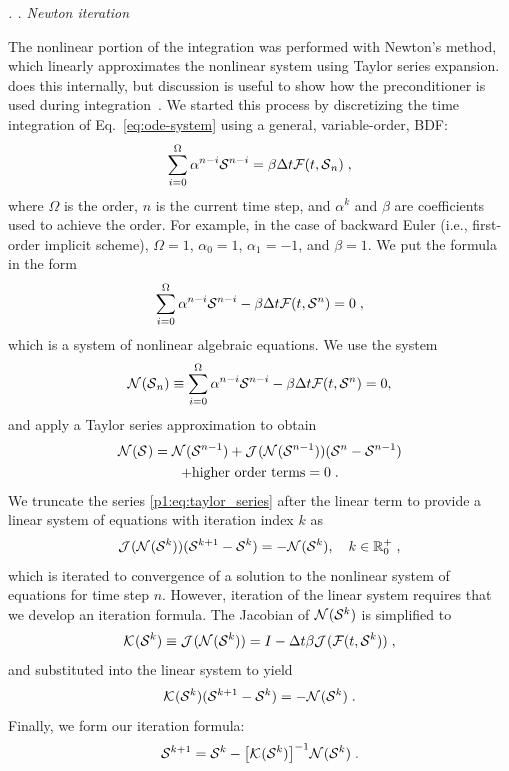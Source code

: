 \documentclass[twocolumn,10pt]{article} %
\renewcommand{\subsection}%
              [1]%
              {%
               \bgroup%
               \flushleft%
               \small\em%
               \stepcounter{subsection}%
               \arabic{section}.%
               \arabic{subsection}. #1%
               \par%
               \egroup%
              }%
\newcommand{\sectionTwo}[1]{\subsection{#1} \addvspace{10pt}}
\begin{document}
\sectionTwo{Newton iteration}

The nonlinear portion of the integration was performed with Newton's method,
which linearly approximates the nonlinear system using Taylor series expansion.
\sundials{} does this internally, but discussion is useful to show how the preconditioner is used during integration~\cite{hindmarsh_sundials_2005}.
We started this process by discretizing the time integration of Eq.~\eqref{eq:ode-system} using a general, variable-order, BDF:
\begin{equation}
    \sum^{\Omega}_{i=0}{\alpha^{n-i} \mathcal{S}{}^{n-i}} = \beta \Delta t\mathcal{F}(t, \mathcal{S}{}_{n}) \;,
\end{equation}
where $\Omega$ is the order, $n$ is the current time step, and
$\alpha^{k}$ and $\beta$ are coefficients used to achieve the order.
For example, in the case of backward Euler (i.e., first-order implicit scheme), $\Omega = 1$, $\alpha_0 = 1$, $\alpha_1 = -1$, and $\beta = 1$.
We put the formula in the form
\begin{equation}
    \sum^{\Omega}_{i=0}{\alpha^{n-i} \mathcal{S}{}^{n-i}} - \beta \Delta t\mathcal{F}(t, \mathcal{S}{}^{n}) = 0 \;,
\end{equation}
which is a system of nonlinear algebraic equations.
We use the system
\begin{equation}
    \mathcal{N}^{}(\mathcal{S}{}_n) \equiv \sum^{\Omega}_{i=0}{\alpha^{n-i} \mathcal{S}{}^{n-i}} - \beta \Delta t\mathcal{F}(t, \mathcal{S}{}^{n}) = 0,
\end{equation}
and apply a Taylor series approximation to obtain
\begin{multline}
    \label{p1:eq:taylor_series}
    \mathcal{N}^{}(\mathcal{S}{}^{}) = \mathcal{N}^{}(\mathcal{S}^{n-1}) + \mathcal{J}^{}(\mathcal{N}^{}(\mathcal{S}{}^{n-1}))(\mathcal{S}{}^{n}-\mathcal{S}{}^{n-1}) \\ + \text{higher order terms} = 0 \;.
\end{multline}
We truncate the series \eqref{p1:eq:taylor_series} after the linear term
to provide a linear system of equations with iteration index $k$ as
\begin{equation}
     \mathcal{J}^{}(\mathcal{N}^{}(\mathcal{S}{}^{k}))(\mathcal{S}{}^{k+1}-\mathcal{S}{}^{k}) = -\mathcal{N}^{}(\mathcal{S}^{k}),\quad k\in\mathbb{R}^{+}_{0} \;,
\end{equation}
which is iterated to convergence of a solution to the nonlinear system of equations for time step $n$.
However, iteration of the linear system requires that we develop an iteration formula.
The Jacobian of $\mathcal{N}^{}(\mathcal{S}{}^{k})$ is simplified to
\begin{equation}
    \mathcal{K}^{}(\mathcal{S}{}^{k}) \equiv \mathcal{J}^{}(\mathcal{N}^{}(\mathcal{S}{}^{k})) = I-\Delta t \beta\mathcal{J}^{}(\mathcal{F}(t,\mathcal{S}{}^{k})) \;,
\end{equation}
and substituted into the linear system to yield
\begin{equation}
    \mathcal{K}^{}(\mathcal{S}{}^{k})(\mathcal{S}{}^{k+1}-\mathcal{S}{}^{k}) = -\mathcal{N}^{}(\mathcal{S}^{k}) \;.
\end{equation}
Finally, we form our iteration formula:
\begin{equation}
    \label{eq:newIterForm}
    \mathcal{S}{}^{k+1} = \mathcal{S}{}^{k}-\big[\mathcal{K}^{}(\mathcal{S}{}^{k})\big]^{-1}\mathcal{N}^{}(\mathcal{S}{}^{k})\;.
\end{equation}
\end{document}

